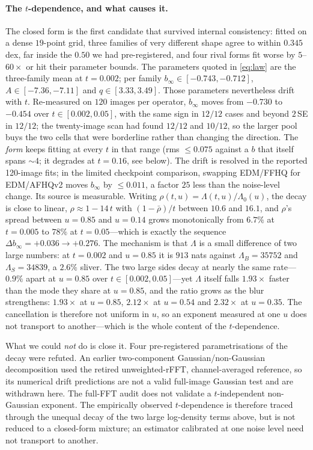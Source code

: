 \documentclass[10pt,journal]{IEEEtran}
\newcommand{\Lam}{\Lambda}
\begin{document}
\paragraph*{The $t$-dependence, and what causes it.}
The closed form is the first candidate that survived internal consistency: fitted on a dense
$19$-point grid, three families of very different shape agree to within $0.345$ dex, far inside
the $0.50$ we had pre-registered, and four rival forms fit worse by $5$--$60\times$ or hit their
parameter bounds. The parameters quoted in \eqref{eq:law} are the three-family mean at
$t=0.002$; per family
$b_\infty\in[-0.743,-0.712]$, $A\in[-7.36,-7.11]$ and $q\in[3.33,3.49]$. Those parameters
nevertheless drift with $t$. Re-measured on $120$ images per operator, $b_\infty$ moves from
$-0.730$ to $-0.454$ over
$t\in[0.002,0.05]$, with the same sign in $12/12$ cases and beyond $2\,$SE in $12/12$; the
twenty-image scan had found $12/12$ and $10/12$, so the larger pool buys the two cells that were
borderline rather than changing the direction. The
\emph{form} keeps fitting at every $t$ in that range (rms $\le0.075$ against a $b$ that itself
spans $\sim4$; it degrades at $t=0.16$, see below). The drift is resolved in the reported 120-image fits; in the limited checkpoint comparison,
swapping EDM/FFHQ for EDM/AFHQv2 moves $b_\infty$ by $\le0.011$, a factor $25$ less than
the noise-level change. Its source is
measurable. Writing $\rho(t,u)=\Lam(t,u)/\Lam_0(u)$, the decay is close to linear,
$\rho\approx1-14\,t$ with $(1-\bar\rho)/t$ between $10.6$ and $16.1$, and $\rho$'s spread
between $u=0.85$ and $u=0.14$ grows monotonically from $6.7\%$ at $t=0.005$ to $78\%$ at
$t=0.05$---which is exactly the sequence $\Delta b_\infty=+0.036\to+0.276$. The mechanism is that $\Lam$ is a
small difference of two large numbers: at $t=0.002$ and $u=0.85$ it is $913$ nats against
$\Lambda_B=35752$ and $\Lambda_S=34839$, a $2.6\%$ sliver. The two large sides decay at nearly
the same rate---$0.9\%$ apart at $u=0.85$ over $t\in[0.002,0.05]$---yet $\Lam$ itself falls
$1.93\times$ faster than the mode they share at $u=0.85$, and the ratio grows as the blur
strengthens: $1.93\times$ at $u=0.85$, $2.12\times$ at $u=0.54$ and $2.32\times$ at $u=0.35$.
The cancellation is therefore not uniform in $u$, so an exponent measured at one $u$ does not
transport to another---which is the whole content of the $t$-dependence.

What we could \emph{not} do is close it. Four pre-registered parametrisations of the decay were
refuted. An earlier two-component Gaussian/non-Gaussian decomposition used the retired
unweighted-rFFT, channel-averaged reference, so its numerical drift predictions are not a valid
full-image Gaussian test and are withdrawn here. The full-FFT audit does not validate a
$t$-independent non-Gaussian exponent. The empirically observed $t$-dependence is therefore
traced through the unequal decay of the two large log-density terms above, but is not reduced
to a closed-form mixture; an estimator calibrated at one noise level need not transport to another.
\end{document}
